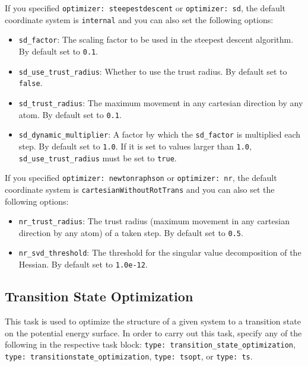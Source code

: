\documentclass[]{tufte-book}
\begin{document}
If you specified \texttt{optimizer: steepestdescent} or \texttt{optimizer: sd}, the default coordinate system is \texttt{internal}
and you can also set the following options:
\begin{itemize}
\item \texttt{sd\_factor}: The scaling factor to be used in the steepest descent algorithm. By default set to \texttt{0.1}.
\item \texttt{sd\_use\_trust\_radius}: Whether to use the trust radius. By default set to \texttt{false}.
\item \texttt{sd\_trust\_radius}: The maximum movement in any cartesian direction by any atom. By default set to \texttt{0.1}.
\item \texttt{sd\_dynamic\_multiplier}: A factor by which the \texttt{sd\_factor} is multiplied each step. By default set to \texttt{1.0}.
If it is set to values larger than \texttt{1.0}, \texttt{sd\_use\_trust\_radius} must be set to \texttt{true}.
\end{itemize}

If you specified \texttt{optimizer: newtonraphson} or \texttt{optimizer: nr}, the default coordinate system is \texttt{cartesianWithoutRotTrans}
and you can also set the following options:
\begin{itemize}
\item \texttt{nr\_trust\_radius}: The trust radius (maximum movement in any cartesian direction by any atom) of a taken step.
By default set to \texttt{0.5}.
\item \texttt{nr\_svd\_threshold}: The threshold for the singular value decomposition of the Hessian. By default set to
\texttt{1.0e-12}.
\end{itemize}

\subsection{Transition State Optimization}

This task is used to optimize the structure of a given system to a transition state on the potential energy surface. In
order to carry out this task, specify any of the following in the respective task block: \texttt{type: transition\_state\_optimization},
\texttt{type: transitionstate\_optimization}, \texttt{type: tsopt}, or \texttt{type: ts}.
\end{document}
